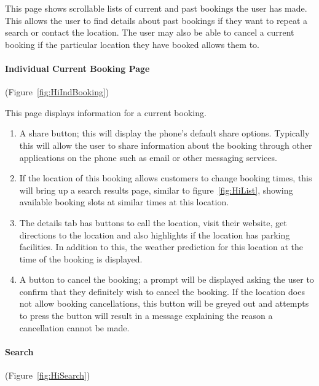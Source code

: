 This page shows scrollable lists of current and past bookings the user has
made. This allows the user to find details about past bookings if they want to
repeat a search or contact the location. The user may also be able to cancel a
current booking if the particular location they have booked allows them to.

\paragraph{Individual Current Booking Page} (Figure~\ref{fig:HiIndBooking})


This page displays information for a current booking.
\begin{enumerate}
	\item A share button; this will display the phone's default share options.
		Typically this will allow the user to share information about the
		booking through other applications on the phone such as email or other
		messaging services.
	\item If the location of this booking allows customers to change booking
		times, this will bring up a search results page, similar to
		figure~\ref{fig:HiList}, showing available booking slots at similar
		times at this location.
	\item The details tab has buttons to call the location, visit their
		website, get directions to the location and also highlights if the
		location has parking facilities. In addition to this, the weather
		prediction for this location at the time of the booking is displayed.
	\item A button to cancel the booking; a prompt will be displayed asking
		the user to confirm that they definitely wish to cancel the booking.
		If the location does not allow booking cancellations, this button will
		be greyed out and attempts to press the button will result in a message
		explaining the reason a cancellation cannot be made.
\end{enumerate}

\paragraph{Search} (Figure~\ref{fig:HiSearch})

